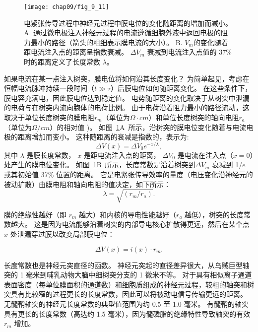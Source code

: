 \begin{figure}[htbp]
	\centering
	\texttt{[image: chap09/fig\_9\_11]}
	\caption{电紧张传导过程中神经元过程中膜电位的变化随距离的增加而减小。
		A. 通过微电极注入神经元过程的电流遵循细胞外液中返回电极的阻力最小的路径（箭头的粗细表示膜电流的大小）。
		B. $V_m$的变化随着距电流注入点的距离呈指数衰减。
		$\Delta V_m$ 衰减到电流注入点值的 37\% 时的距离定义了长度常数 $\lambda$。}
	\label{fig:9_11}
\end{figure}

如果电流在某一点注入树突，膜电位将如何沿其长度变化？
为简单起见，考虑在恒幅电流脉冲持续一段时间（$t \gg \tau$）后膜电位如何随距离变化。
在这些条件下，膜电容充满电，因此膜电位达到稳定值。
电势随距离的变化取决于从树突中泄漏的电荷与在树突内流向胞体的电荷比例。
由于电荷沿着阻力最小的路径流动，这取决于单位长度树突的膜电阻$r_m$（单位为$\Omega \cdot cm$）和单位长度树突的轴向电阻$r_a$（单位为$\Omega/cm$）的相对值 )。
如图~\ref{fig:9_11}A~所示，沿树突的膜电位变化随着与电流电极的距离增加而变小。
这种随距离的衰减是指数的，表示为:
\begin{equation}
	\Delta V(x) = 
		\Delta V_0 e^{-x/\lambda},
\end{equation}
其中 $\lambda$ 是膜长度常数，
$x$ 是距电流注入点的距离，
$\Delta V_0$ 是电流在注入点（$x = 0$）处产生的膜电位变化。
如图~\ref{fig:9_11}B~所示，长度常数是沿着树突到$\Delta V_m$ 衰减到 1/$e$ 或其初始值 37\% 位置的距离。
它是电紧张传导效率的量度（电压变化沿神经元的被动扩散）由膜电阻和轴向电阻的值决定，如下所示：
\begin{equation}
	\lambda = \sqrt{(r_m / r_a)}.
\end{equation}


膜的绝缘性越好（即 $r_m$ 越大）和内核的导电性能越好（$r_a$ 越低），树突的长度常数越大。
这是因为电流能够沿着树突的内部导电核心扩散得更远，然后在某个点 $x$ 处泄漏穿过膜以改变局部膜电位：

\begin{equation}
	\Delta V(x) = i(x) \cdot r_m.
\end{equation}


长度常数也是神经元突直径的函数。
神经元突起的直径差异很大，从乌贼巨型轴突的 1 毫米到哺乳动物大脑中细树突分支的 1 微米不等。
对于具有相似离子通道表面密度（每单位膜面积的通道数）和细胞质组成的神经元过程，较粗的轴突和树突具有比较窄的过程更长的长度常数，因此可以将被动电信号传输更远的距离。
无髓鞘轴突的神经元长度常数的典型值范围为约 0.5 至 1.0 毫米。
有髓鞘的轴突具有更长的长度常数（高达约 1.5 毫米），因为髓磷脂的绝缘特性导致轴突的有效 $r_m$ 增加。


